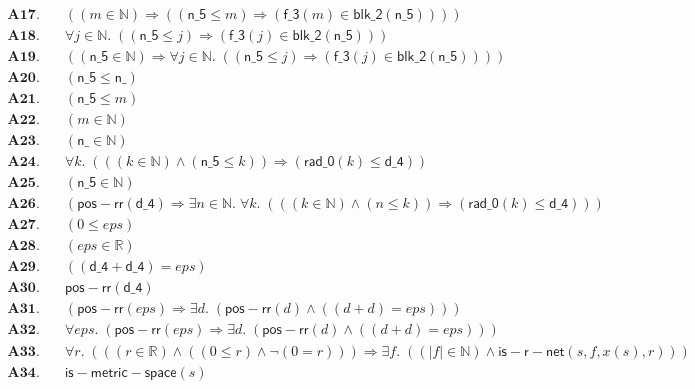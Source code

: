 \documentclass[11pt]{article}
\begin{document}
\begin{align*}
  \mathbf{A17.}\quad & ((m \in \mathbb{N}) \Rightarrow ((\mathsf{n\_5} \leq m) \Rightarrow (\mathsf{f\_3}(m) \in \mathsf{blk\_2}(\mathsf{n\_5})))) \\
  \mathbf{A18.}\quad & \forall j \in \mathbb{N}.\; ((\mathsf{n\_5} \leq j) \Rightarrow (\mathsf{f\_3}(j) \in \mathsf{blk\_2}(\mathsf{n\_5}))) \\
  \mathbf{A19.}\quad & ((\mathsf{n\_5} \in \mathbb{N}) \Rightarrow \forall j \in \mathbb{N}.\; ((\mathsf{n\_5} \leq j) \Rightarrow (\mathsf{f\_3}(j) \in \mathsf{blk\_2}(\mathsf{n\_5})))) \\
  \mathbf{A20.}\quad & (\mathsf{n\_5} \leq \mathsf{n\_}) \\
  \mathbf{A21.}\quad & (\mathsf{n\_5} \leq m) \\
  \mathbf{A22.}\quad & (m \in \mathbb{N}) \\
  \mathbf{A23.}\quad & (\mathsf{n\_} \in \mathbb{N}) \\
  \mathbf{A24.}\quad & \forall k.\; (((k \in \mathbb{N}) \wedge (\mathsf{n\_5} \leq k)) \Rightarrow (\mathsf{rad\_0}(k) \leq \mathsf{d\_4})) \\
  \mathbf{A25.}\quad & (\mathsf{n\_5} \in \mathbb{N}) \\
  \mathbf{A26.}\quad & (\mathsf{pos{-}rr}(\mathsf{d\_4}) \Rightarrow \exists n \in \mathbb{N}.\; \forall k.\; (((k \in \mathbb{N}) \wedge (n \leq k)) \Rightarrow (\mathsf{rad\_0}(k) \leq \mathsf{d\_4}))) \\
  \mathbf{A27.}\quad & (0 \leq \mathit{eps}) \\
  \mathbf{A28.}\quad & (\mathit{eps} \in \mathbb{R}) \\
  \mathbf{A29.}\quad & ((\mathsf{d\_4} + \mathsf{d\_4}) = \mathit{eps}) \\
  \mathbf{A30.}\quad & \mathsf{pos{-}rr}(\mathsf{d\_4}) \\
  \mathbf{A31.}\quad & (\mathsf{pos{-}rr}(\mathit{eps}) \Rightarrow \exists d.\; (\mathsf{pos{-}rr}(d) \wedge ((d + d) = \mathit{eps}))) \\
  \mathbf{A32.}\quad & \forall \mathit{eps}.\; (\mathsf{pos{-}rr}(\mathit{eps}) \Rightarrow \exists d.\; (\mathsf{pos{-}rr}(d) \wedge ((d + d) = \mathit{eps}))) \\
  \mathbf{A33.}\quad & \forall r.\; (((r \in \mathbb{R}) \wedge ((0 \leq r) \wedge \neg (0 = r))) \Rightarrow \exists f.\; ((|f| \in \mathbb{N}) \wedge \mathsf{is{-}r{-}net}(s, f, x(s), r))) \\
  \mathbf{A34.}\quad & \mathsf{is{-}metric{-}space}(s) \\

\end{align*}
\end{document}

